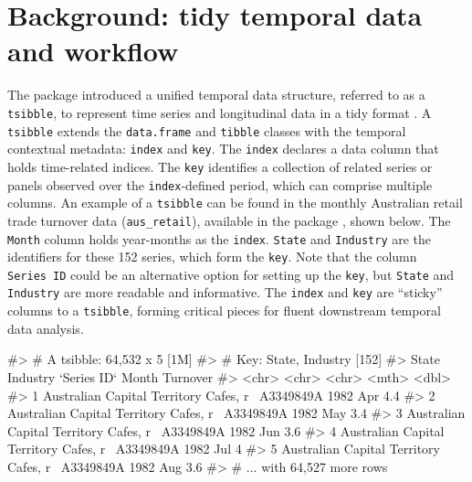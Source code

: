 \hypertarget{background-tidy-temporal-data-and-workflow}{%
\section{Background: tidy temporal data and
workflow}\label{background-tidy-temporal-data-and-workflow}}

The  package \citep{wang2020tsibble} introduced a
unified temporal data structure, referred to as a \texttt{tsibble}, to
represent time series and longitudinal data in a tidy format
\citep{wickham2014tidy}. A \texttt{tsibble} extends the
\texttt{data.frame} and \texttt{tibble} classes with the temporal
contextual metadata: \texttt{index} and \texttt{key}. The \texttt{index}
declares a data column that holds time-related indices. The \texttt{key}
identifies a collection of related series or panels observed over the
\texttt{index}-defined period, which can comprise multiple columns. An
example of a \texttt{tsibble} can be found in the monthly Australian
retail trade turnover data (\texttt{aus\_retail}), available in the
 package \citep{R-tsibbledata}, shown below. The
\texttt{Month} column holds year-months as the \texttt{index}.
\texttt{State} and \texttt{Industry} are the identifiers for these 152
series, which form the \texttt{key}. Note that the column
\texttt{Series\ ID} could be an alternative option for setting up the
\texttt{key}, but \texttt{State} and \texttt{Industry} are more readable
and informative. The \texttt{index} and \texttt{key} are ``sticky''
columns to a \texttt{tsibble}, forming critical pieces for fluent
downstream temporal data analysis.

\begin{Schunk}
\begin{Soutput}
#> # A tsibble: 64,532 x 5 [1M]
#> # Key:       State, Industry [152]
#>   State                        Industry  `Series ID`    Month Turnover
#>   <chr>                        <chr>     <chr>          <mth>    <dbl>
#> 1 Australian Capital Territory Cafes, r~ A3349849A   1982 Apr      4.4
#> 2 Australian Capital Territory Cafes, r~ A3349849A   1982 May      3.4
#> 3 Australian Capital Territory Cafes, r~ A3349849A   1982 Jun      3.6
#> 4 Australian Capital Territory Cafes, r~ A3349849A   1982 Jul      4  
#> 5 Australian Capital Territory Cafes, r~ A3349849A   1982 Aug      3.6
#> # ... with 64,527 more rows
\end{Soutput}
\end{Schunk}

